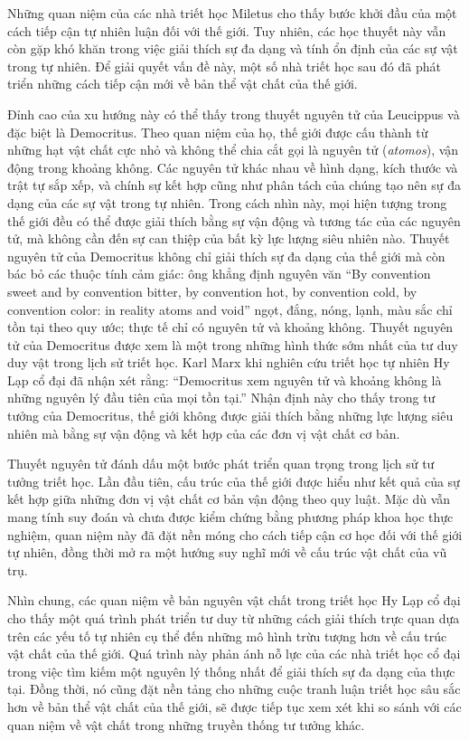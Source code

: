 \documentclass[14pt,a4paper]{extarticle}
\begin{document}
Những quan niệm của các nhà triết học Miletus cho thấy bước khởi đầu của một cách tiếp cận tự nhiên luận đối với thế giới. Tuy nhiên, các học thuyết này vẫn còn gặp khó khăn trong việc giải thích sự đa dạng và tính ổn định của các sự vật trong tự nhiên. Để giải quyết vấn đề này, một số nhà triết học sau đó đã phát triển những cách tiếp cận mới về bản thể vật chất của thế giới.

Đỉnh cao của xu hướng này có thể thấy trong thuyết nguyên tử của Leucippus và đặc biệt là Democritus. Theo quan niệm của họ, thế giới được cấu thành từ những hạt vật chất cực nhỏ và không thể chia cắt gọi là nguyên tử (\emph{atomos}), vận động trong khoảng không. Các nguyên tử khác nhau về hình dạng, kích thước và trật tự sắp xếp, và chính sự kết hợp cũng như phân tách của chúng tạo nên sự đa dạng của các sự vật trong tự nhiên. Trong cách nhìn này, mọi hiện tượng trong thế giới đều có thể được giải thích bằng sự vận động và tương tác của các nguyên tử, mà không cần đến sự can thiệp của bất kỳ lực lượng siêu nhiên nào. Thuyết nguyên tử của Democritus không chỉ giải thích sự đa dạng của thế giới mà còn bác bỏ các thuộc tính cảm giác: ông khẳng định nguyên văn ``By convention sweet and by convention bitter, by convention hot, by convention cold, by convention color: in reality atoms and void''\cite{sep-presocratic} ngọt, đắng, nóng, lạnh, màu sắc chỉ tồn tại theo quy ước; thực tế chỉ có nguyên tử và khoảng không. Thuyết nguyên tử của Democritus được xem là một trong những hình thức sớm nhất của tư duy duy vật trong lịch sử triết học. Karl Marx khi nghiên cứu triết học tự nhiên Hy Lạp cổ đại đã nhận xét rằng: ``Democritus xem nguyên tử và khoảng không là những nguyên lý đầu tiên của mọi tồn tại.''\cite{marx-epicurus} Nhận định này cho thấy trong tư tưởng của Democritus, thế giới không được giải thích bằng những lực lượng siêu nhiên mà bằng sự vận động và kết hợp của các đơn vị vật chất cơ bản.

Thuyết nguyên tử đánh dấu một bước phát triển quan trọng trong lịch sử tư tưởng triết học. Lần đầu tiên, cấu trúc của thế giới được hiểu như kết quả của sự kết hợp giữa những đơn vị vật chất cơ bản vận động theo quy luật. Mặc dù vẫn mang tính suy đoán và chưa được kiểm chứng bằng phương pháp khoa học thực nghiệm, quan niệm này đã đặt nền móng cho cách tiếp cận cơ học đối với thế giới tự nhiên, đồng thời mở ra một hướng suy nghĩ mới về cấu trúc vật chất của vũ trụ.

Nhìn chung, các quan niệm về bản nguyên vật chất trong triết học Hy Lạp cổ đại cho thấy một quá trình phát triển tư duy từ những cách giải thích trực quan dựa trên các yếu tố tự nhiên cụ thể đến những mô hình trừu tượng hơn về cấu trúc vật chất của thế giới. Quá trình này phản ánh nỗ lực của các nhà triết học cổ đại trong việc tìm kiếm một nguyên lý thống nhất để giải thích sự đa dạng của thực tại. Đồng thời, nó cũng đặt nền tảng cho những cuộc tranh luận triết học sâu sắc hơn về bản thể vật chất của thế giới, sẽ được tiếp tục xem xét khi so sánh với các quan niệm về vật chất trong những truyền thống tư tưởng khác.
\end{document}
